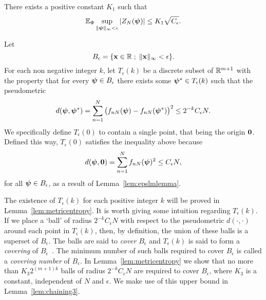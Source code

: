 \documentclass[journal]{IEEEtran}
\begin{document}
\begin{lemma}\label{lem:chaining2}
There exists a positive constant $K_1$ such that
\[
{\mathbb E}_\Phi \sup_{\|\boldsymbol{\psi}\|_{\infty} < \epsilon} \left\vert  Z_N(\boldsymbol{\psi})  \right\vert \leq K_1 \sqrt{C_\epsilon}.
\]
\end{lemma}
\begin{IEEEproof}
Let
\[
B_\epsilon = \{\mathbf{x} \in {\mathbb R} \; ; \; \|\mathbf{x}\|_\infty < \epsilon \}.
\]
For each non negative integer $k$, let $T_\epsilon(k)$ be a discrete subset of ${\mathbb R}^{m+1}$ with the property that for every $\boldsymbol{\psi} \in B_\epsilon$ there exists some $\boldsymbol{\psi}^* \in T_\epsilon(k)$ such that the pseudometric
\[
d(\boldsymbol{\psi}, \boldsymbol{\psi}^*) = \sum_{n = 1}^N \big( f_{nN}(\boldsymbol{\psi}) - f_{nN}(\boldsymbol{\psi}^*) \big)^2 \leq 2^{-k} C_\epsilon N.
\]
We specifically define $T_\epsilon(0)$ to contain a single point, that being the origin $\boldsymbol{0}$.  Defined this way, $T_\epsilon(0)$ satisfies the inequality above because
\[
d(\boldsymbol{\psi}, \boldsymbol{0}) = \sum_{n = 1}^N f_{nN}(\boldsymbol{\psi})^2  \leq C_\epsilon N ,
\]
for all $\boldsymbol{\psi} \in B_\epsilon$, as a result of Lemma~\ref{lem:epslmlemma}.

The existence of $T_\epsilon(k)$ for each positive integer $k$ will be proved in Lemma~\ref{lem:metricentropy}.  It is worth giving some intuition regarding $T_\epsilon(k)$.  If we place a `ball' of radius $2^{-k} C_\epsilon N$  with respect to the pseudometric $d(\cdot, \cdot)$ around each point in $T_\epsilon(k)$, then, by definition, the union of these balls is a superset of $B_\epsilon$.  The balls are said to \emph{cover} $B_\epsilon$ and $T_\epsilon(k)$ is said to form a \emph{covering} of $B_\epsilon$~\cite[Section 1.2]{Dudley_unif_central_lim_th_1999}.  The minimum number of such balls required to cover $B_\epsilon$ is called a \emph{covering number} of $B_\epsilon$.  In Lemma~\ref{lem:metricentropy} we show that no more than $K_3 2^{(m+1)k}$ balls of radius $2^{-k} C_\epsilon N$ are required to cover $B_\epsilon$, where $K_3$ is a constant, independent of $N$ and $\epsilon$.  We make use of this upper bound in Lemma~\ref{lem:chaining3}.


\end{IEEEproof}
\end{document}
